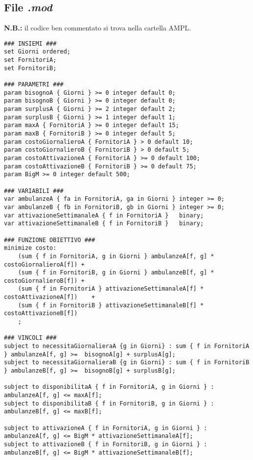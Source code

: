 \subsection{File \textit{.mod}}
\textbf{N.B.:} il codice ben commentato si trova nella cartella AMPL\@.
\begin{lstlisting}
### INSIEMI ###
set Giorni ordered;
set FornitoriA;
set FornitoriB;

### PARAMETRI ###
param bisognoA { Giorni } >= 0 integer default 0;
param bisognoB { Giorni } >= 0 integer default 0;
param surplusA { Giorni } >= 2 integer default 2;
param surplusB { Giorni } >= 1 integer default 1;
param maxA { FornitoriA } >= 0 integer default 15;
param maxB { FornitoriB } >= 0 integer default 5;
param costoGiornalieroA { FornitoriA } > 0 default 10;
param costoGiornalieroB { FornitoriB } > 0 default 5;
param costoAttivazioneA { FornitoriA } >= 0 default 100;
param costoAttivazioneB { FornitoriB } >= 0 default 75;
param BigM >= 0 integer default 500;

### VARIABILI ###
var ambulanzeA { fa in FornitoriA, ga in Giorni } integer >= 0; 
var ambulanzeB { fb in FornitoriB, gb in Giorni } integer >= 0;
var attivazioneSettimanaleA { f in FornitoriA }   binary;
var attivazioneSettimanaleB { f in FornitoriB }	  binary;

### FUNZIONE OBIETTIVO ###
minimize costo: 
    (sum { f in FornitoriA, g in Giorni } ambulanzeA[f, g] * costoGiornalieroA[f]) +
    (sum { f in FornitoriB, g in Giorni } ambulanzeB[f, g] * costoGiornalieroB[f]) +
    (sum { f in FornitoriA } attivazioneSettimanaleA[f] * costoAttivazioneA[f])	   +
    (sum { f in FornitoriB } attivazioneSettimanaleB[f] * costoAttivazioneB[f])
    ;

### VINCOLI ###
subject to necessitaGiornalieraA {g in Giorni} : sum { f in FornitoriA } ambulanzeA[f, g] >=  bisognoA[g] + surplusA[g];
subject to necessitaGiornalieraB {g in Giorni} : sum { f in FornitoriB } ambulanzeB[f, g] >=  bisognoB[g] + surplusB[g];

subject to disponibilitaA { f in FornitoriA, g in Giorni } :  ambulanzeA[f, g] <= maxA[f];
subject to disponibilitaB { f in FornitoriB, g in Giorni } :  ambulanzeB[f, g] <= maxB[f]; 

subject to attivazioneA { f in FornitoriA, g in Giorni } : ambulanzeA[f, g] <= BigM * attivazioneSettimanaleA[f];
subject to attivazioneB { f in FornitoriB, g in Giorni } : ambulanzeB[f, g] <= BigM * attivazioneSettimanaleB[f]; 

\end{lstlisting}